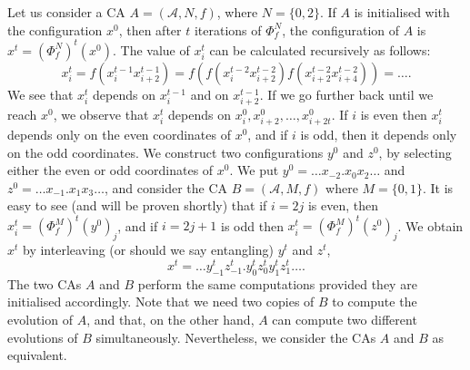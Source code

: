 \documentclass[a4paper]{article}
\begin{document}
Let us consider a CA $A = (\mathcal{A}, N, f)$, where $N = \{0,2\}$.
If $A$ is initialised with the configuration $x^0$, then after $t$ iterations
of $\Phi^N_f$, the configuration of $A$ is $x^t = (\Phi^N_f)^t(x^0)$.
The value of $x^t_i$ can be calculated recursively as follows:
\[
x^t_i =  f(x^{t-1}_ix^{t-1}_{i+2}) = f(f(x^{t-2}_ix^{t-2}_{i+2}) f(x^{t-2}_{i+2}x^{t-2}_{i+4})  ) = \ldots.
\]
We see that $x^t_i$ depends on $x^{t-1}_i$ and on $x^{t-1}_{i+2}$.
If we go further back until we reach $x^0$, we observe that $x^t_i$ depends on $x^0_i,x^0_{i+2}, \ldots, x^0_{i+2t}$.
If $i$ is even then $x^t_i$ depends only on the even coordinates of $x^0$,
and if $i$ is odd, then it depends only on the odd coordinates.
We construct two configurations $y^0$ and $z^0$, by
selecting either the even or odd coordinates of $x^0$.
We put $y^0 = \ldots x_{-2}.x_0x_2 \ldots$ and $z^0 = \ldots x_{-1}.x_1x_3 \ldots$,
and consider the CA $B = (\mathcal{A}, M, f)$ where $M = \{0,1\}$.
It is easy to see (and will be proven shortly) that if $i=2j$ is even,
then $x^t_{i}= (\Phi^M_f)^t(y^0)_j$, and if
$i=2j+1$ is odd then $x^t_{i} = (\Phi^M_f)^t(z^0)_j$.
We obtain $x^t$
by interleaving (or should we say entangling) $y^t$ and $z^t$,
\[
x^t = \ldots y^t_{-1}z^t_{-1}.y^t_0z^t_0y^t_1z^t_1 \ldots.
\]
The two CAs $A$ and $B$ perform the same computations provided they are initialised accordingly.
Note that we need two copies of $B$ to compute the evolution of $A$, and that, on the other hand,
$A$ can compute two different evolutions of $B$ simultaneously.
Nevertheless, we consider the CAs $A$ and $B$ as equivalent.
\end{document}
